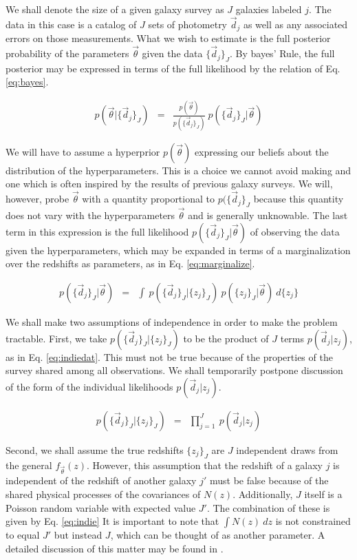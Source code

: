 \documentclass[preprint]{aastex}
\begin{document}
We shall denote the size of a given galaxy survey as $J$ galaxies labeled $j$.  The data in this case is a catalog of $J$ sets of photometry $\vec{d}_{j}$ as well as any associated errors on those measurements.  What we wish to estimate is the full posterior probability of the parameters $\vec{\theta}$ given the data $\{\vec{d}_{j}\}_{J}$.  By bayes' Rule, the full posterior may be expressed in terms of the full likelihood by the relation of Eq. \ref{eq:bayes}.  

\begin{eqnarray}
\label{eq:bayes}
p(\vec{\theta}|\{\vec{d}_{j}\}_{J}) &=& \frac{p(\vec{\theta})}{p(\{\vec{d}_{j}\}_{J})}\ p(\{\vec{d}_{j}\}_{J}|\vec{\theta})
\end{eqnarray}

We will have to assume a hyperprior $p(\vec{\theta})$ expressing our beliefs about the distribution of the hyperparameters.  This is a choice we cannot avoid making and one which is often inspired by the results of previous galaxy surveys.  We will, however, probe $\vec{\theta}$ with a quantity proportional to $p(\{\vec{d}_{j}\}_{J}$ because this quantity does not vary with the hyperparameters $\vec{\theta}$ and is generally unknowable.  The last term in this expression is the full likelihood $p(\{\vec{d}_{j}\}_{J}|\vec{\theta})$ of observing the data given the hyperparameters, which may be expanded in terms of a marginalization over the redshifts as parameters, as in Eq. \ref{eq:marginalize}.  

\begin{eqnarray}
\label{eq:marginalize}
p(\{\vec{d}_{j}\}_{J}|\vec{\theta}) &=& \int\ p(\{\vec{d}_{j}\}_{J}|\{z_{j}\}_{J})\ p(\{z_{j}\}_{J}|\vec{\theta})\ d\{z_{j}\}
\end{eqnarray}

We shall make two assumptions of independence in order to make the problem tractable.  First, we take $p(\{\vec{d}_{j}\}_{J}|\{z_{j}\}_{J})$ to be the product of $J$ terms $p(\vec{d}_{j}|z_{j})$, as in Eq. \ref{eq:indiedat}.  This must not be true because of the properties of the survey shared among all observations.  We shall temporarily postpone discussion of the form of the individual likelihoods $p(\vec{d}_{j}|z_{j})$.  

\begin{eqnarray}
\label{eq:indiedat}
p(\{\vec{d}_{j}\}_{J}|\{z_{j}\}_{J}) &=& \prod_{j=1}^{J}\ p(\vec{d}_{j}|z_{j})
\end{eqnarray}

Second, we shall assume the true redshifts $\{z_{j}\}_{J}$ are $J$ independent draws from the general $f_{\vec{\theta}}(z)$.  However, this assumption that the redshift of a galaxy $j$ is independent of the redshift of another galaxy $j'$ must be false because of the shared physical processes of the covariances of $N(z)$.  Additionally, $J$ itself is a Poisson random variable with expected value $J'$.  The combination of these is given by Eq. \ref{eq:indie}  It is important to note that $\int N(z)\ dz$ is not constrained to equal $J'$ but instead $J$, which can be thought of as another parameter.  A detailed discussion of this matter may be found in \citet{for14}.
\end{document}
